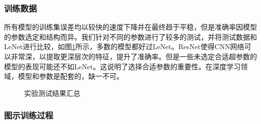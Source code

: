\documentclass[hyperref, UTF8, 12pt]{article}
\theoremstyle{definition}
\begin{document}
\subsubsection{训练数据}
所有模型的训练集误差均以较快的速度下降并在最终趋于平稳，但是准确率因模型的参数选定和结构而异。我们针对不同的参数进行了较多的测试，并将测试数据和LeNet进行比较，如图\ref{fig:total}所示，多数的模型都好过LeNet。ResNet使得CNN网络可以非常深，以提取更深层次的特征，提升了准确率。但是一些未选定合适超参数的模型的表现可能还不如LeNet。这说明了选择合适参数的重要性。在深度学习领域，模型和参数是配套的，缺一不可。
\begin{figure}[H]
	\centering
	\caption{实验测试结果汇总}
	\label{fig:total}
\end{figure}

\subsubsection{图示训练过程}
\end{document}
